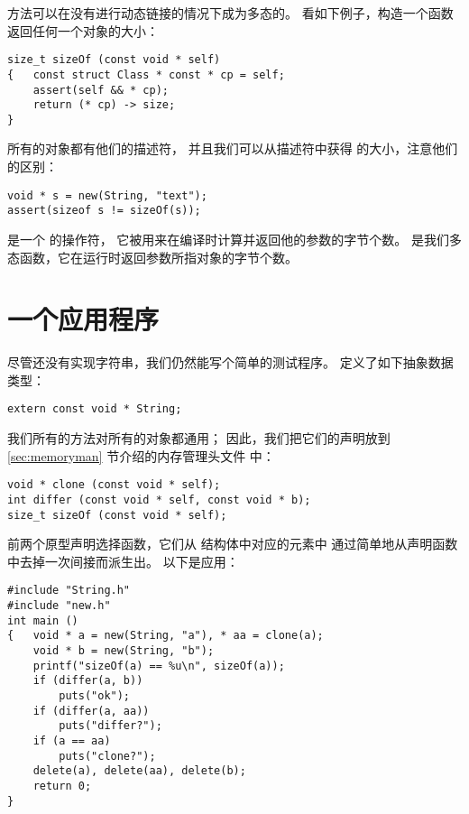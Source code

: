 方法可以在没有进行动态链接的情况下成为多态的。
看如下例子，构造一个函数  返回任何一个对象的大小：

\begin{lstlisting}
size_t sizeOf (const void * self)
{   const struct Class * const * cp = self;
    assert(self && * cp);
    return (* cp) -> size;
}
\end{lstlisting}

所有的对象都有他们的描述符，
并且我们可以从描述符中获得  的大小，注意他们的区别：
\begin{lstlisting}
void * s = new(String, "text");
assert(sizeof s != sizeOf(s));
\end{lstlisting}

 是一个  的操作符，
它被用来在编译时计算并返回他的参数的字节个数。
 是我们多态函数，它在运行时返回参数所指对象的字节个数。


\section{一个应用程序}
\label{sec:dlApp}

尽管还没有实现字符串，我们仍然能写个简单的测试程序。
 定义了如下抽象数据类型：
\begin{lstlisting}
extern const void * String;
\end{lstlisting}

我们所有的方法对所有的对象都通用；
因此，我们把它们的声明放到 \ref{sec:memoryman} 节介绍的内存管理头文件
 中：
\begin{lstlisting}
void * clone (const void * self);
int differ (const void * self, const void * b);
size_t sizeOf (const void * self);
\end{lstlisting}

前两个原型声明选择函数，它们从  结构体中对应的元素中
通过简单地从声明函数中去掉一次间接而派生出。
以下是应用：
\begin{lstlisting}
#include "String.h"
#include "new.h"
int main ()
{   void * a = new(String, "a"), * aa = clone(a);
    void * b = new(String, "b");
    printf("sizeOf(a) == %u\n", sizeOf(a));
    if (differ(a, b))
        puts("ok");
    if (differ(a, aa))
        puts("differ?");
    if (a == aa)
        puts("clone?");
    delete(a), delete(aa), delete(b);
    return 0;
}
\end{lstlisting}

